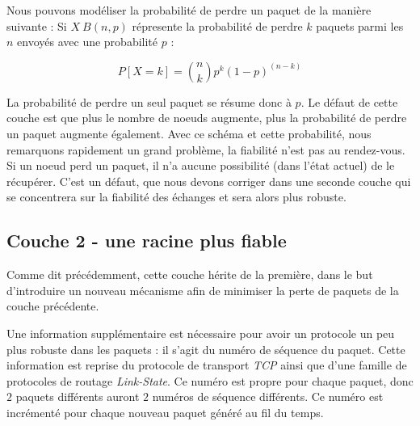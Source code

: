 \documentclass[journal, a4paper]{IEEEtran}
\begin{document}
        Nous pouvons modéliser la probabilité de perdre un paquet de la manière suivante : Si $X~B(n, p)$ répresente la probabilité de perdre $k$ paquets parmi les $n$
        envoyés avec une probabilité $p$ : 

        $$
        P [X = k] = \binom{n}{k} p^k (1 - p)^{(n-k)}
        $$

        La probabilité de perdre un seul paquet se résume donc à $p$. Le défaut de cette couche est que plus le nombre de noeuds augmente, plus la probabilité de perdre un paquet augmente également. 
        Avec ce schéma et cette probabilité, nous remarquons rapidement un grand problème, la fiabilité n'est pas au rendez-vous. Si un noeud perd un paquet, il n'a aucune possibilité (dans l'état 
        actuel) de le récupérer. C'est un défaut, que nous devons corriger dans une seconde couche qui se concentrera sur la fiabilité des échanges et sera alors plus robuste.


\subsection{Couche 2 - une racine plus fiable}
        Comme dit précédemment, cette couche hérite de la première, dans le but d'introduire un nouveau mécanisme afin de minimiser la perte de paquets 
        de la couche précédente.

        Une information supplémentaire est nécessaire pour avoir un protocole un peu plus robuste dans les paquets : il s'agit du numéro de séquence du paquet. Cette information est reprise 
        du protocole de transport \textit{TCP} ainsi que d'une famille de protocoles de routage \textit{Link-State}.
        Ce numéro est propre pour chaque paquet, donc $2$ paquets différents auront $2$ numéros de séquence différents. Ce numéro est incrémenté pour chaque nouveau paquet généré au fil du temps. \\
\end{document}
